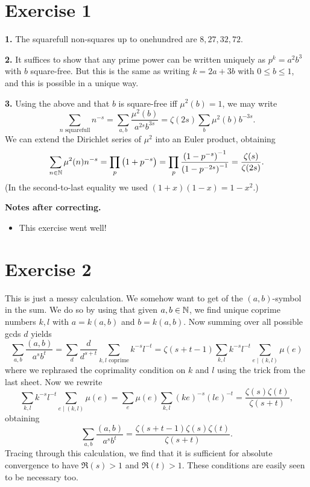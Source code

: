 \documentclass[a4paper,11pt]{article}
\begin{document}
\section*{Exercise 1}
\textbf{1.} The squarefull non-squares up to onehundred are $8,27,32,72$.

\textbf{2.} It suffices to show that any prime power can be written uniquely as
$p^k = a^2 b^3$ with $b$ square-free. But this is the same as writing $k =
2a+3b$ with $0 \leq b \leq 1$, and this is possible in a unique way. 

\textbf{3.} Using the above and that $b$ is square-free iff $\mu^2(b) = 1$, we may write
\[
    \sum_{n \text{ squarefull}} n^{-s} = \sum_{a,b} \frac{\mu^2(b)}{a^{2s} b^{3s}} = \zeta(2s) \sum_{b} \mu^2(b) b^{-3s}.
\]
We can extend the Dirichlet series of $\mu^2$ into an Euler product, obtaining
\[
    \sum_{n \in \mathbb{N}} \mu^2(n)n^{-s} = \prod_p \left(1 + p^{-s} \right) = \prod_p
    \frac {\left(1 - p^{-s}\right)^{-1}} {\left(1 - p^{-2s}\right)^{-1}} =
    \frac {\zeta(s)}{\zeta(2s)}.
\]
(In the second-to-last equality we used $(1+x)(1-x) = 1-x^2$.)

\textbf{Notes after correcting.} \leavevmode
\begin{itemize}
    \item This exercise went well!
\end{itemize}

\section*{Exercise 2}
This is just a messy calculation. 
We somehow want to get of the $(a,b)$-symbol in the sum. We do so by using that
given $a,b \in \mathbb{N}$, we find unique coprime numbers $k, l$ with $a = k (a,b)$ and 
$b = k (a,b)$. Now summing over all possible gcds $d$ yields
\[
    \sum_{a,b} \frac{(a,b)}{a^s b^t} = \sum_{d} \frac d{d^{s+t}} \sum_{k,l
    \text{ coprime}} k^{-s}l^{-t} = \zeta(s+t-1)\sum_{k,l} k^{-s}l^{-t} \sum_{e \mid (k,l)} \mu(e)
\]
where we rephrased the coprimality condition on $k$ and $l$ using the trick
from the last sheet.
Now we rewrite
\[
    \sum_{k,l} k^{-s}l^{-t} \sum_{e \mid (k,l)} \mu(e) = \sum_e \mu(e)
    \sum_{k,l} (ke)^{-s} (le)^{-t} = \frac{\zeta(s)\zeta(t)}{\zeta(s+t)},
\]
obtaining
\[
    \sum_{a,b} \frac{(a,b)}{a^s b^t} = \frac {\zeta(s+t-1) \zeta(s) \zeta(t)}{\zeta(s+t)}.
\]
Tracing through this calculation, we find that it is sufficient for absolute convergence to have
$\Re(s)>1$ and $\Re(t) > 1$. These conditions are easily seen to be necessary too.
\end{document}
